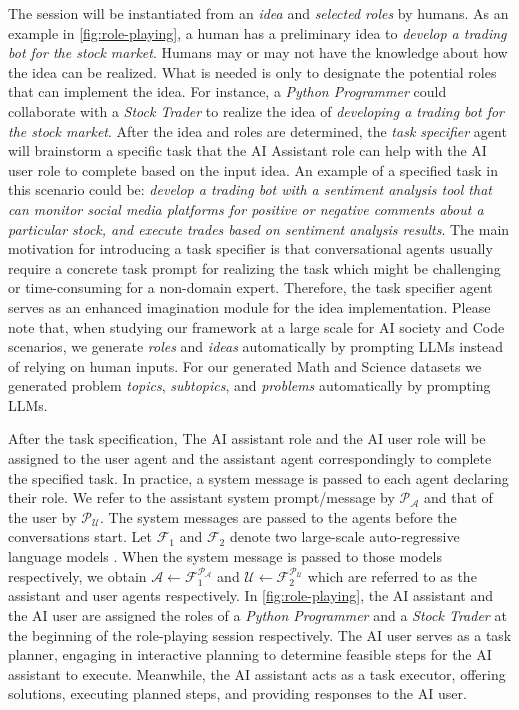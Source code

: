  The \RP session will be instantiated from an \textit{idea} and \textit{selected roles} by humans. As an example in \figLabel \ref{fig:role-playing}, a human has a preliminary idea to \textit{develop a trading bot for the stock market}. Humans may or may not have the knowledge about how the idea can be realized. What is needed is only to designate the potential roles that can implement the idea. For instance, a \textit{Python Programmer} could collaborate with a \textit{Stock Trader} to realize the idea of \textit{developing a trading bot for the stock market}. After the idea and roles are determined, the \textit{task specifier} agent will brainstorm a specific task that the AI Assistant role can help with the AI user role to complete based on the input idea. An example of a specified task in this scenario could be: \textit{develop a trading bot with a sentiment analysis tool that can monitor social media platforms for positive or negative comments about a particular stock, and execute trades based on sentiment analysis results}. The main motivation for introducing a task specifier is that conversational agents usually require a concrete task prompt for realizing the task which might be challenging or time-consuming for a non-domain expert. 
Therefore, the task specifier agent serves as an enhanced imagination module for the idea implementation. Please note that, when studying our framework at a large scale for AI society and Code scenarios, we generate \textit{roles} and \textit{ideas} automatically by prompting LLMs instead of relying on human inputs. For our generated Math and Science datasets we generated problem \textit{topics}, \textit{subtopics}, and \textit{problems} automatically by prompting LLMs. 

 After the task specification, The AI assistant role and the AI user role will be assigned to the user agent and the assistant agent correspondingly to complete the specified task. In practice, a system message is passed to each agent declaring their role. We refer to the assistant system prompt/message by $\mathcal{P}_\mathcal{A}$ and that of the user by $\mathcal{P}_\mathcal{U}$. The system messages are passed to the agents before the conversations start. 
Let $\mathcal{F}_1$ and $\mathcal{F}_2$ denote two large-scale auto-regressive language models \cite{openai_chatgpt}. When the system message is passed to those models respectively, we obtain $\mathcal{A} \leftarrow \mathcal{F}_{1}^{\mathcal{P}_{\mathcal{A}}}$ and $\mathcal{U} \leftarrow \mathcal{F}_{2}^{\mathcal{P}_{\mathcal{U}}}$ which are referred to as the assistant and user agents respectively. In \figLabel \ref{fig:role-playing}, the AI assistant and the AI user are assigned the roles of a \textit{Python Programmer} and a \textit{Stock Trader} at the beginning of the role-playing session respectively. The AI user serves as a task planner, engaging in interactive planning to determine feasible steps for the AI assistant to execute. Meanwhile, the AI assistant acts as a task executor, offering solutions, executing planned steps, and providing responses to the AI user.

